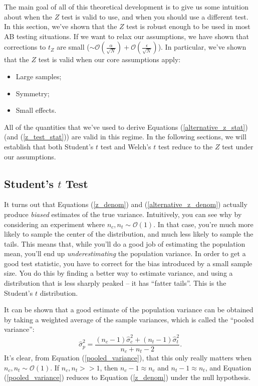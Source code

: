 \documentclass{article}
\numberwithin{equation}{section}
\begin{document}
The main goal of all of this theoretical development is to give us some intuition about when the $Z$ test is valid to use, and when you should use a different test. In this section, we've shown that the $Z$ test is robust enough to be used in most AB testing situations. If we want to relax our assumptions, we have shown that corrections to $t_Z$ are small ($\sim \mathcal{O}\left(\frac{\alpha}{\sqrt{N}}\right) + \mathcal{O}\left(\frac{\epsilon}{\sqrt{N}}\right)$). In particular, we've shown that the $Z$ test is valid when our core assumptions apply:
\begin{itemize}
	\item Large samples;
	\item Symmetry; 
	\item Small effects.
\end{itemize}
All of the quantities that we've used to derive Equations (\ref{alternative_z_stat}) (and (\ref{z_test_stat})) are valid in this regime. In the following sections, we will establish that both Student's $t$ test and Welch's $t$ test reduce to the $Z$ test under our assumptions.

\subsection{Student's $t$ Test}

It turns out that Equations (\ref{z_denom}) and (\ref{alternative_z_denom}) actually produce \textit{biased} estimates of the true variance. Intuitively, you can see why by considering an experiment where $n_c, n_t \sim \mathcal{O}(1)$. In that case, you're much more likely to sample the center of the distribution, and much less likely to sample the tails. This means that, while you'll do a good job of estimating the population mean, you'll end up \textit{underestimating} the population variance. In order to get a good test statistic, you have to correct for the bias introduced by a small sample size. You do this by finding a better way to estimate variance, and using a distribution that is less sharply peaked -- it has ``fatter tails''. This is the Student's $t$ distribution.

It can be shown that a good estimate of the population variance can be obtained by taking a weighted average of the sample variances, which is called the ``pooled variance'':
\begin{equation} \label{pooled_variance}
	\hat{\sigma}_p^2 = \frac{\left(n_c - 1\right) \hat{\sigma}_c^2 + \left(n_t - 1\right) \hat{\sigma}_t^2}{n_c + n_t - 2}.
\end{equation}
It's clear, from Equation (\ref{pooled_variance}), that this only really matters when $n_c, n_t \sim \mathcal{O}(1)$. If $n_c, n_t >> 1$, then $n_c - 1 \approx n_c$ and $n_t - 1 \approx n_t$, and Equation (\ref{pooled_variance}) reduces to Equation (\ref{z_denom}) under the null hypothesis.
\end{document}

